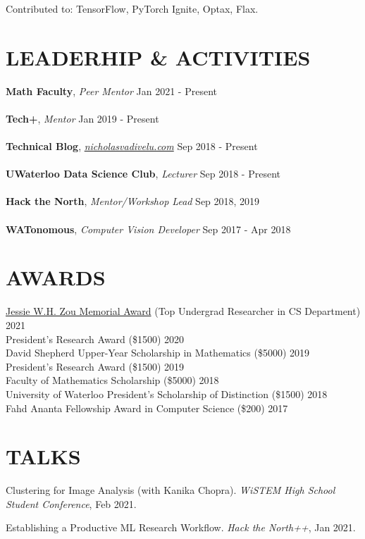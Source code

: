 \documentclass[line,margin]{res}
\newcommand{\experience}[3]{\textbf{#1}, \textit{#2} \hfill #3 \\ \vspace{-4mm}}
\newcommand{\talk}[4]{#1. \textit{#2}, #4. \vspace{-2mm}}
\newcommand{\award}[2]{#1 \hfill #2}
\begin{document}
\begin{resume}
    Contributed to: TensorFlow, PyTorch Ignite, Optax, Flax.

\section{LEADERHIP \& ACTIVITIES}
    \experience{Math Faculty}{Peer Mentor}{Jan 2021 - Present} \\
    \experience{Tech+}{Mentor}{Jan 2019 - Present} \\
    \experience{Technical Blog}{\href{https://nicholasvadivelu.com/}{nicholasvadivelu.com}}{Sep 2018 - Present} \\
    \experience{UWaterloo Data Science Club}{Lecturer}{Sep 2018 - Present} \\
    \experience{Hack the North}{Mentor/Workshop Lead}{Sep 2018, 2019} \\
    \experience{WATonomous}{Computer Vision Developer}{Sep 2017 - Apr 2018}

\section{AWARDS}
    \award{\href{https://cs.uwaterloo.ca/news/nicholas-vadivelu-receives-2021-jessie-w-h-zou-memorial-award}{Jessie W.H. Zou Memorial Award} (Top Undergrad Researcher in CS Department)}{2021}\\
    \award{President's Research Award (\$1500)}{2020}\\
    \award{David Shepherd Upper-Year Scholarship in Mathematics (\$5000)}{2019}\\
    \award{President's Research Award (\$1500)}{2019}\\
    \award{Faculty of Mathematics Scholarship (\$5000)}{2018}\\
    \award{University of Waterloo President's Scholarship of Distinction (\$1500)}{2018}\\
    \award{Fahd Ananta Fellowship Award in Computer Science (\$200)}{2017}

\section{TALKS}
    \talk
    {Clustering for Image Analysis (with Kanika Chopra)}
    {WiSTEM High School Student Conference}{Virtual}{Feb 2021}

    \talk
    {Establishing a Productive ML Research Workflow}
    {Hack the North++}{Virtual}{Jan 2021}


\end{resume}
\end{document}
